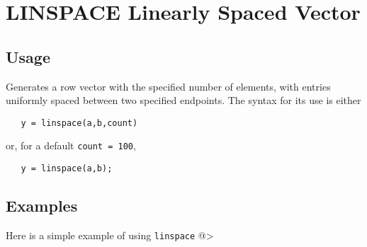 \section{LINSPACE Linearly Spaced Vector}

\subsection{Usage}

Generates a row vector with the specified number of elements, with
entries uniformly spaced between two specified endpoints.  The syntax
for its use is either
\begin{verbatim}
   y = linspace(a,b,count)
\end{verbatim}
or, for a default \verb|count = 100|,
\begin{verbatim}
   y = linspace(a,b);
\end{verbatim}
\subsection{Examples}

Here is a simple example of using \verb|linspace|
@>
